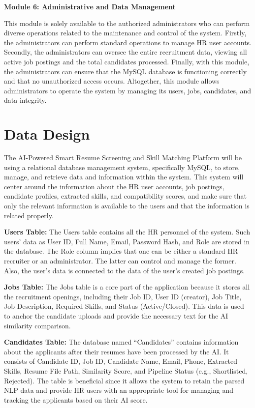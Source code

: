 \documentclass[12pt,a4paper]{report}
\begin{document}
\textbf{Module 6: Administrative and Data Management}

This module is solely available to the authorized administrators who can perform diverse operations related to the maintenance and control of the system. Firstly, the administrators can perform standard operations to manage HR user accounts. Secondly, the administrators can oversee the entire recruitment data, viewing all active job postings and the total candidates processed. Finally, with this module, the administrators can ensure that the MySQL database is functioning correctly and that no unauthorized access occurs. Altogether, this module allows administrators to operate the system by managing its users, jobs, candidates, and data integrity.



\section{Data Design}
The AI-Powered Smart Resume Screening and Skill Matching Platform will be using a relational database management system, specifically MySQL, to store, manage, and retrieve data and information within the system. This system will center around the information about the HR user accounts, job postings, candidate profiles, extracted skills, and compatibility scores, and make sure that only the relevant information is available to the users and that the information is related properly.

\textbf{Users Table:}
The Users table contains all the HR personnel of the system. Such users’ data as User ID, Full Name, Email, Password Hash, and Role are stored in the database. The Role column implies that one can be either a standard HR recruiter or an administrator. The latter can control and manage the former. Also, the user’s data is connected to the data of the user’s created job postings.

\textbf{Jobs Table:}
The Jobs table is a core part of the application because it stores all the recruitment openings, including their Job ID, User ID (creator), Job Title, Job Description, Required Skills, and Status (Active/Closed). This data is used to anchor the candidate uploads and provide the necessary text for the AI similarity comparison.

\textbf{Candidates Table:}
The database named “Candidates” contains information about the applicants after their resumes have been processed by the AI. It consists of Candidate ID, Job ID, Candidate Name, Email, Phone, Extracted Skills, Resume File Path, Similarity Score, and Pipeline Status (e.g., Shortlisted, Rejected). The table is beneficial since it allows the system to retain the parsed NLP data and provide HR users with an appropriate tool for managing and tracking the applicants based on their AI score.
\end{document}
